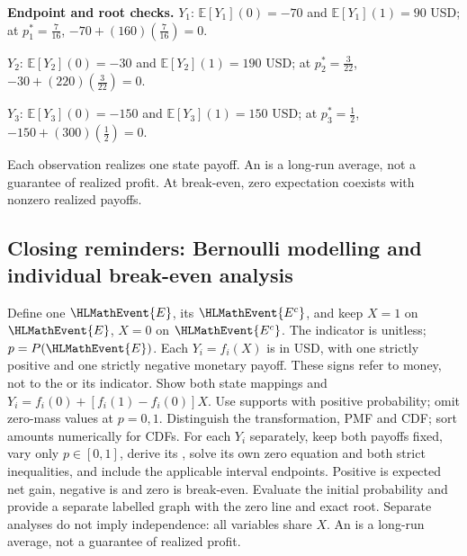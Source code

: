 \textbf{Endpoint and root checks.} $Y_1$: $\mathbb E[Y_1](0)=-70$ and $\mathbb E[Y_1](1)=90$ USD; at $p_1^*=\frac{7}{16}$, $-70+(160)(\frac{7}{16})=0$.

$Y_2$: $\mathbb E[Y_2](0)=-30$ and $\mathbb E[Y_2](1)=190$ USD; at $p_2^*=\frac{3}{22}$, $-30+(220)(\frac{3}{22})=0$.

$Y_3$: $\mathbb E[Y_3](0)=-150$ and $\mathbb E[Y_3](1)=150$ USD; at $p_3^*=\frac{1}{2}$, $-150+(300)(\frac{1}{2})=0$.

Each observation realizes one state payoff. An  is a long-run average,
not a guarantee of realized profit. At break-even, zero expectation coexists with nonzero realized payoffs.
\CThreeExpectAgriculture
{}

\clearpage\subsection*{Closing reminders: Bernoulli modelling and individual break-even analysis}
Define one  $\HLMathEvent{E}$, its  $\HLMathEvent{E^c}$, and keep $X=1$ on $\HLMathEvent{E}$, $X=0$ on $\HLMathEvent{E^c}$.
The indicator is unitless; $p=P(\HLMathEvent{E})$. Each $Y_i=f_i(X)$ is in USD, with one
strictly positive and one strictly negative monetary payoff. These signs refer
to money, not to the  or its indicator. Show both state mappings and
$Y_i=f_i(0)+[f_i(1)-f_i(0)]X$.
Use supports with positive probability; omit zero-mass values at $p=0,1$.
Distinguish the transformation, PMF and CDF; sort amounts numerically for CDFs.
For each $Y_i$ separately, keep both payoffs fixed, vary only $p\in\left[0,1\right]$,
derive its , solve its own zero equation and both strict inequalities,
and include the applicable interval endpoints. Positive  is expected
net gain, negative is  and zero is break-even. Evaluate the initial
probability and provide a separate labelled graph with the zero line and exact root.
Separate analyses do not imply independence: all variables share $X$.
An  is a long-run average, not a guarantee of realized profit.

